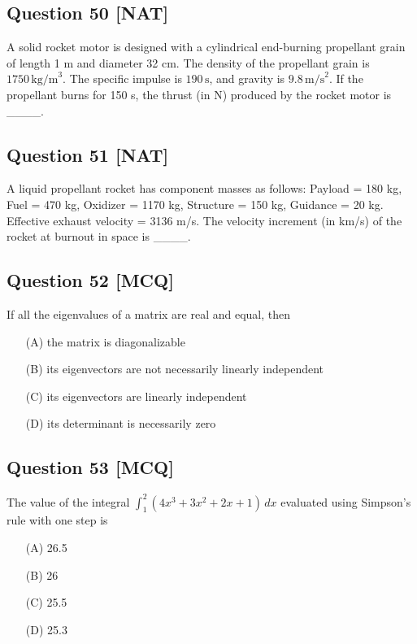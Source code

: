 \documentclass[12pt,a4paper]{article}
\begin{document}
\vspace{0.5cm}

\subsection*{Question 50 [NAT]}
A solid rocket motor is designed with a cylindrical end-burning propellant grain of length 1 m and diameter 32 cm. The density of the propellant grain is \( 1750 \, \text{kg/m}^3 \). The specific impulse is \( 190 \, \text{s} \), and gravity is \( 9.8 \, \text{m/s}^2 \). If the propellant burns for 150 s, the thrust (in N) produced by the rocket motor is \_\_\_\_.

\vspace{0.5cm}

\subsection*{Question 51 [NAT]}
A liquid propellant rocket has component masses as follows:  
Payload = 180 kg, Fuel = 470 kg, Oxidizer = 1170 kg, Structure = 150 kg, Guidance = 20 kg.  
Effective exhaust velocity = 3136 m/s.  
The velocity increment (in km/s) of the rocket at burnout in space is \_\_\_\_.

\vspace{0.5cm}

\subsection*{Question 52 [MCQ]}

If all the eigenvalues of a matrix are real and equal, then  
\begin{itemize}
\item[(A)] the matrix is diagonalizable  
\item[(B)] its eigenvectors are not necessarily linearly independent  
\item[(C)] its eigenvectors are linearly independent  
\item[(D)] its determinant is necessarily zero  
\end{itemize}

\vspace{0.5cm}

\subsection*{Question 53 [MCQ]}
The value of the integral \( \int_1^2 (4x^3 + 3x^2 + 2x + 1) \, dx \) evaluated using Simpson’s rule with one step is  
\begin{itemize}
\item[(A)] 26.5  
\item[(B)] 26  
\item[(C)] 25.5  
\item[(D)] 25.3  
\end{itemize}
\end{document}

